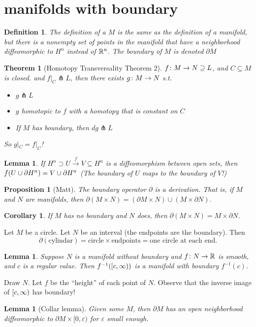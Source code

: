 \documentclass[11pt]{amsbook}
\theoremstyle{mystyle} %
\newtheorem{thrm}[thm]{Theorem}
\newtheorem{defi}[thm]{Definition}
\newtheorem{coro}[thm]{Corollary}
\newtheorem{propo}[thm]{Proposition}
\newtheorem{lemm}[thm]{Lemma}
\numberwithin{thm}{section}
\renewcommand{\epsilon}{\varepsilon}
\renewcommand{\d}{\partial}
\newcommand{\transverse}{\pitchfork}
\newcommand{\x}{\times}
\begin{document}
\section{manifolds with boundary}
\begin{defi}
	The definition of a  $M$ is the same as the definition of a manifold, but there is a nonempty set of points in the manifold that have a neighborhood diffeomorphic to $H^n$ instead of ${\mathbb R}^n$.  The boundary of $M$ is denoted $\d M$
\end{defi}

\begin{thrm}[Homotopy Transversality Theorem 2]
	$f\colon M \to N \supseteq L$, and $C \subseteq M$ is closed.
	and $f|_C \transverse L$, then there exists
	$g\colon M \to N$ s.t.
	\begin{itemize}
		\item $g \transverse L$
		\item $g$ homotopic to $f$ with a homotopy that is constant on $C$
		\item If $M$ has boundary, then $dg \transverse L$
	\end{itemize}
	So $g|_C = f|_C$!
\end{thrm}
\begin{lemm}
	If $H^n \supset U \overset{f}{\to} V \subseteq H^n$ is a diffeomorphism between open sets, then $f( U \union \d H^n ) = V \union \d H^n$
	(The boundary of $U$ maps to the boundary of $V$!)
\end{lemm}
\begin{propo}[Matt]
	The boundary operator $\d$ is a derivation.  That is, if $M$ and $N$ are manifolds, then $\d(M \x N) = (\d M \x N) \cup (M \x \d N)$.
\end{propo}
\begin{coro}
	If $M$ has no boundary and $N$ does, then $\d(M \x N) = M \x \d N$.
\end{coro}
\begin{example}
	Let $M$ be a circle.  Let $N$ be an interval (the endpoints are the boundary).  Then $$\d(\text{cylindar}) = \text{circle} \x \text{endpoints} = \text{one circle at each end}.$$
\end{example}
\begin{lemm}
	Suppose $N$ is a manifold without boundary and $f \colon N \to {\mathbb R}$ is smooth, and $c$ is a regular value.  Then $f^{-1}([c,\infty))$ is a manifold with boundary $f^{-1}(c)$.
\end{lemm}
\begin{example}
	Draw $N$.  Let $f$ be the ``height'' of each point of $N$.  Observe that the inverse image of $[c, \infty)$ has boundary!
\end{example}
\begin{lemm}[Collar lemma]
	Given some $M$, then $\d M$ has an open neighborhood diffeomorphic to $\d M \x [0, \epsilon)$ for $\epsilon$ small enough.
\end{lemm}
\end{document}
